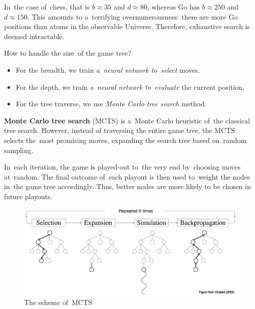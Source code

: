 In~the case of~chess, that is $b \approx 35$ and $d \approx 80$, whereas Go has $b \approx 250$ and $d \approx 150$.
This amounts to a~terrifying overnumerousness: there are more Go positions than atoms in the observable Universe.
Therefore, exhaustive search is deemed intractable.

How to handle the size~of the game tree?
\begin{itemize}
  \item For the breadth, we train \emph{a~neural network to~select} moves.
  \item For the depth, we train \emph{a~neural network to~evaluate} the current position.
  \item For the tree traverse, we use \emph{Monte Carlo tree search} method.
\end{itemize}

\textbf{Monte Carlo tree search} (MCTS) is a~Monte Carlo heuristic of~the classical tree search.
However, instead of traversing the entire game tree, the MCTS selects the~most promising moves, expanding the search tree based on~random sampling.

In~each iteration, the game is played-out to~the very end by~choosing moves at~random.
The final outcome of~each playout is then used to~weight the nodes in~the game tree accordingly.
Thus, better nodes are more likely to be chosen in future playouts.

\begin{figure}[H]
  \centering
  \includegraphics[width=.6\textwidth]{../img/MCTS.png}
  \caption{The scheme of~MCTS}
  \label{fig:MCTS}
\end{figure}

